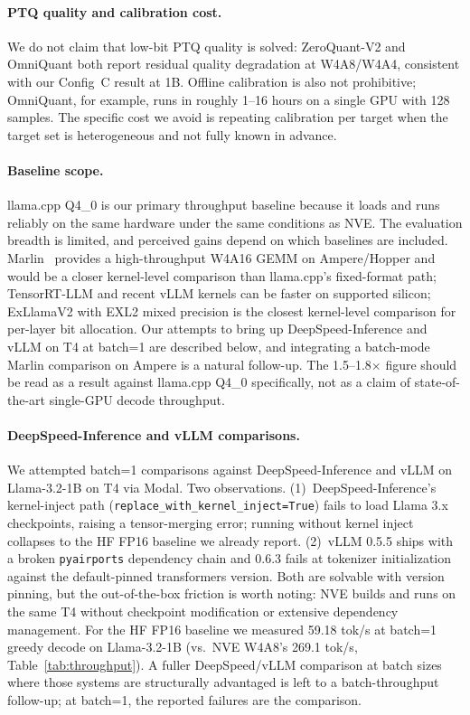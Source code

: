 \documentclass{article}
\begin{document}
\paragraph{PTQ quality and calibration cost.} We do not claim that
low-bit PTQ quality is solved: ZeroQuant-V2 and OmniQuant both report
residual quality degradation at W4A8/W4A4, consistent with our Config~C
result at 1B. Offline calibration is also not prohibitive; OmniQuant,
for example, runs in roughly 1--16 hours on a single GPU with 128
samples. The specific cost we avoid is repeating calibration per target
when the target set is heterogeneous and not fully known in advance.

\paragraph{Baseline scope.} llama.cpp Q4\_0 is our primary throughput
baseline because it loads and runs reliably on the same hardware under
the same conditions as NVE. The evaluation breadth is limited, and
perceived gains depend on which baselines are included.
Marlin~\cite{frantar2024marlin} provides a high-throughput W4A16 GEMM on
Ampere/Hopper and would be a closer kernel-level comparison than
llama.cpp's fixed-format path; TensorRT-LLM and recent vLLM kernels can
be faster on supported silicon; ExLlamaV2 with EXL2 mixed precision is
the closest kernel-level comparison for per-layer bit allocation. Our
attempts to bring up DeepSpeed-Inference and vLLM on T4 at batch=1 are
described below, and integrating a batch-mode Marlin comparison on
Ampere is a natural follow-up. The 1.5--1.8$\times$ figure should be
read as a result against llama.cpp Q4\_0 specifically, not as a claim
of state-of-the-art single-GPU decode throughput.

\paragraph{DeepSpeed-Inference and vLLM comparisons.}
\begin{sloppypar}
We attempted batch=1 comparisons against DeepSpeed-Inference and vLLM on
Llama-3.2-1B on T4 via Modal. Two observations. (1)~DeepSpeed-Inference's
kernel-inject path (\texttt{replace\_with\_kernel\_inject=True}) fails to
load Llama 3.x checkpoints, raising a tensor-merging error; running without
kernel inject collapses to the HF FP16 baseline we already report.
(2)~vLLM 0.5.5 ships with a broken \texttt{pyairports} dependency chain and
0.6.3 fails at tokenizer initialization against the default-pinned
transformers version. Both are solvable with version pinning, but the
out-of-the-box friction is worth noting: NVE builds and runs on the same T4
without checkpoint modification or extensive dependency management. For the
HF FP16 baseline we measured 59.18 tok/s at batch=1 greedy decode on
Llama-3.2-1B (vs.\ NVE W4A8's 269.1 tok/s, Table~\ref{tab:throughput}). A
fuller DeepSpeed/vLLM comparison at batch sizes where those systems are
structurally advantaged is left to a batch-throughput follow-up; at batch=1,
the reported failures are the comparison.
\end{sloppypar}
\end{document}
